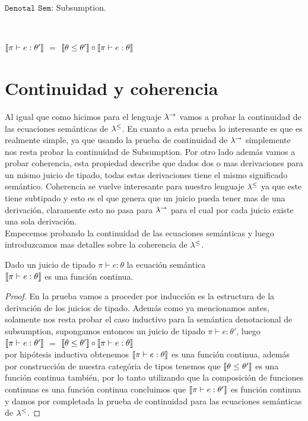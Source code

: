\noindent
$\texttt{Denotal Sem:}$ Subsumption.\

\

$\llbracket \pi \vdash e : \theta' \rrbracket$ $=$ $\llbracket \theta \leq \theta' \rrbracket \circ \llbracket \pi \vdash e : \theta \rrbracket$

\section{Continuidad y coherencia}

Al igual que como hicimos para el lenguaje $\lambda^{\rightarrow}$ vamos a probar la
continuidad de las ecuaciones sem\'anticas de $\lambda^{\leq}$. En cuanto a 
esta prueba lo interesante es que es realmente simple, ya que usando la 
prueba de continuidad de $\lambda^{\rightarrow}$ simplemente nos resta probar 
la continuidad de Subsumption. Por otro lado adem\'as vamos a probar coherencia,
esta propiedad describe que dados dos o mas derivaciones para un mismo
juicio de tipado, todas estas derivaciones tiene el mismo significado
sem\'antico. Coherencia se vuelve interesante para nuestro lenguaje $\lambda^{\leq}$
ya que este tiene subtipado y esto es el que genera que un juicio pueda
tener mas de una derivaci\'on, claramente esto no pasa para $\lambda^{\rightarrow}$ para
el cual por cada juicio existe una sola derivaci\'on.\\

Empecemos probando la continuidad de las ecuaciones sem\'anticas y luego
introduzcamos mas detalles sobre la coherencia de $\lambda^{\leq}$.

\begin{theorem}

Dado un juicio de tipado $\pi \vdash e : \theta$ la ecuaci\'on sem\'antica
\\ 
$\llbracket \pi \vdash e : \theta \rrbracket$ es una funci\'on continua.

\end{theorem}

\begin{proof}

En la prueba vamos a proceder por inducci\'on es la estructura de la derivaci\'on 
de los juicios de tipado. Adem\'as como ya mencionamos antes, solamente nos resta
probar el caso inductivo para la sem\'antica denotacional de subsumption, supongamos
entonces un juicio de tipado $\pi \vdash e : \theta'$, luego\\

$\llbracket \pi \vdash e : \theta' \rrbracket$ $=$ $\llbracket \theta \leq \theta' \rrbracket \circ \llbracket \pi \vdash e : \theta \rrbracket$\\

por hip\'otesis inductiva obtenemos $\llbracket \pi \vdash e : \theta \rrbracket$ es una funci\'on
continua, adem\'as por construcci\'on de nuestra categ\'oria de tipos
tenemos que $\llbracket \theta \leq \theta' \rrbracket$ es una funci\'on continua tambi\'en, 
por lo tanto utilizando que la composici\'on de funciones continuas es una funci\'on
continua concluimos que $\llbracket \pi \vdash e : \theta' \rrbracket$ es funci\'on continua y
damos por completada la prueba de continuidad para las ecuaciones sem\'anticas
de $\lambda^{\leq}$.

\end{proof}

